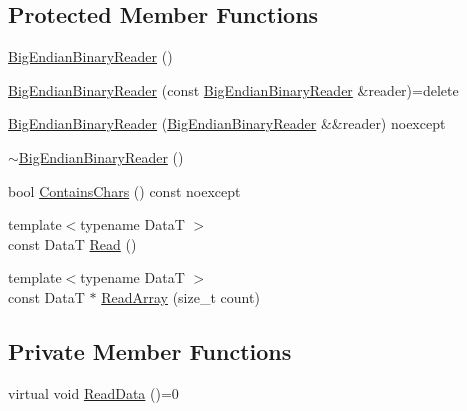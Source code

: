 \subsection*{Protected Member Functions}
\begin{DoxyCompactItemize}
\item 
\mbox{\hyperlink{classmage_1_1_big_endian_binary_reader_a1fd0dbee6950a8cb04aa399f0cdbaf2a}{Big\+Endian\+Binary\+Reader}} ()
\item 
\mbox{\hyperlink{classmage_1_1_big_endian_binary_reader_a9d490263268290217ae4f2f06e0699c4}{Big\+Endian\+Binary\+Reader}} (const \mbox{\hyperlink{classmage_1_1_big_endian_binary_reader}{Big\+Endian\+Binary\+Reader}} \&reader)=delete
\item 
\mbox{\hyperlink{classmage_1_1_big_endian_binary_reader_a16c4303dfb333ebdddfc07c924b9735a}{Big\+Endian\+Binary\+Reader}} (\mbox{\hyperlink{classmage_1_1_big_endian_binary_reader}{Big\+Endian\+Binary\+Reader}} \&\&reader) noexcept
\item 
\mbox{\hyperlink{classmage_1_1_big_endian_binary_reader_ae85a40e8ed06e8c887e38d914843b8d3}{$\sim$\+Big\+Endian\+Binary\+Reader}} ()
\item 
bool \mbox{\hyperlink{classmage_1_1_big_endian_binary_reader_ac6de015b6bbcecdcef58ab074d99fb49}{Contains\+Chars}} () const noexcept
\item 
{\footnotesize template$<$typename DataT $>$ }\\const DataT \mbox{\hyperlink{classmage_1_1_big_endian_binary_reader_a5353ce3b1eaedd51ccb4d2d951bf499b}{Read}} ()
\item 
{\footnotesize template$<$typename DataT $>$ }\\const DataT $\ast$ \mbox{\hyperlink{classmage_1_1_big_endian_binary_reader_a534f06cc9b44757271595c614e8793d2}{Read\+Array}} (size\+\_\+t count)
\end{DoxyCompactItemize}
\subsection*{Private Member Functions}
\begin{DoxyCompactItemize}
\item 
virtual void \mbox{\hyperlink{classmage_1_1_big_endian_binary_reader_a7dc0689d598fa91308597b129516a11d}{Read\+Data}} ()=0
\end{DoxyCompactItemize}
